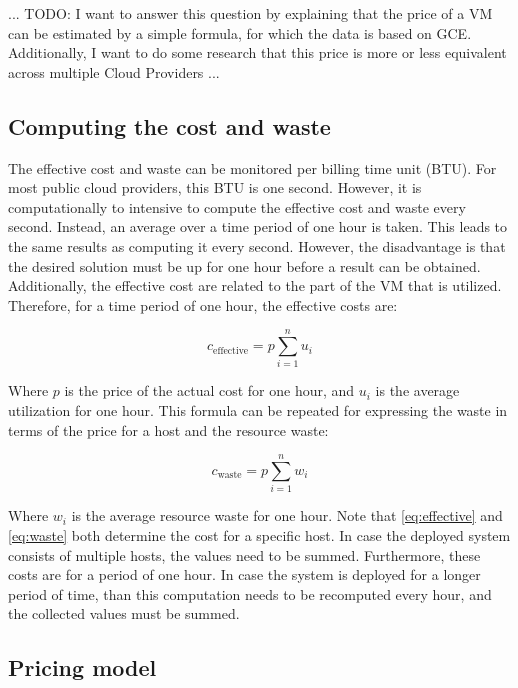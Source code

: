 ...
TODO: I want to answer this question by explaining that the price of a VM can be estimated by a simple formula, for which the data is based on GCE. Additionally, I want to do some research that this price is more or less equivalent across multiple Cloud Providers
...
\subsection{Computing the cost and waste} \label{sec:model}
The effective cost and waste can be monitored per billing time unit (BTU). For most public cloud providers, this BTU is one second. However, it is computationally to intensive to compute the effective cost and waste every second. Instead, an average over a time period of one hour is taken. This leads to the same results as computing it every second. However, the disadvantage is that the desired solution must be up for one hour before a result can be obtained. Additionally, the effective cost are related to the part of the VM that is utilized. Therefore, for a time period of one hour, the effective costs are:

\begin{equation} \label{eq:effective}
c_\text{effective} = p \sum_{i=1}^n u_i
\end{equation}

Where $p$ is the price of the actual cost for one hour, and $u_i$ is the average utilization for one hour. This formula can be repeated for expressing the waste in terms of the price for a host and the resource waste:

\begin{equation} \label{eq:waste}
c_\text{waste} = p \sum_{i=1}^n w_i
\end{equation}

Where $w_i$ is the average resource waste for one hour. Note that \autoref{eq:effective} and \autoref{eq:waste} both determine the cost for a specific host. In case the deployed system consists of multiple hosts, the values need to be summed. Furthermore, these costs are for a period of one hour. In case the system is deployed for a longer period of time, than this computation needs to be recomputed every hour, and the collected values must be summed. 

\subsection{Pricing model} \label{sec:pricing}






